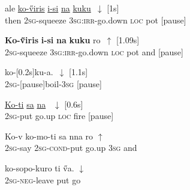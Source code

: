 \documentclass[output=paper]{LSP/langsci}
\begin{document}
\begin{appendixexe}
 \ex \label{Guapp12}
\gll  ale    \underline{ko-\H{v}iris}          \underline{i-si}                 \underline{na}   \underline{kuku}~$\downarrow$  [1s]\\     	       
then   \textsc{2sg}-squeeze     \textsc{3sg:irr-}go.down   \textsc{loc}  pot  [pause]\\
\glt {} 
\end{appendixexe}

 \begin{appendixexe}
 \ex \label{Guapp13}
\gll      \textbf{Ko-\H{v}iris}          \textbf{i-si}                 \textbf{na}   \textbf{kuku} ro~$\uparrow$  [1.09s]\\     	       
   \textsc{2sg}-squeeze     \textsc{3sg:irr-}go.down   \textsc{loc}  pot  and [pause]\\
\glt {} 
\end{appendixexe}


  \begin{appendixexe}
 \ex \label{Guapp14}
\gll  ko-[0.2s]ku-a.~$\downarrow$  [1.1s]  \\     	       
\textsc{2sg}-[pause]boil-\textsc{3sg} [pause] \\
\glt {} 
\end{appendixexe}

  \begin{appendixexe}
 \ex \label{Guapp15}
\gll  \underline{Ko-ti}       \underline{sa}     \underline{na}  \underline{}~$\downarrow$  [0.6s]  \\     	       
\textsc{2sg}-put   go.up   \textsc{loc}  fire [pause] \\
\glt {} 
\end{appendixexe}

  \begin{appendixexe}
 \ex \label{Guapp16}
\gll  Ko-v      ko-mo-ti          sa      nna   ro $\uparrow$   \\     	       
\textsc{2sg}-say \textsc{2sg-cond}-put   go.up   \textsc{3sg}   and  \\
\glt {} 
\end{appendixexe}

  \begin{appendixexe}
 \ex \label{Guapp17}
\gll  ko-sopo-kuro    ti    \H{v}a. $\downarrow$   \\     	       
\textsc{2sg-neg}-leave   put   go  \\
\glt {} 
\end{appendixexe}
\end{document}

